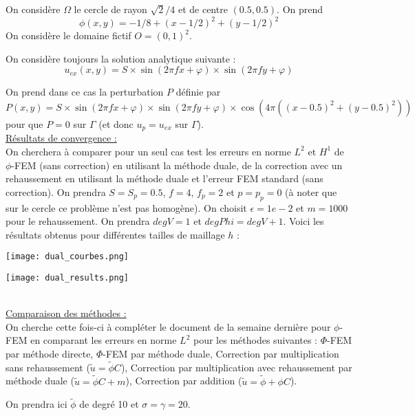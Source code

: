 On considère $\Omega$ le cercle de rayon $\sqrt{2}/4$ et de centre $(0.5,0.5)$. On prend 
$$\phi(x,y)=-1/8+(x-1/2)^2+(y-1/2)^2$$
On considère le domaine fictif $O=(0,1)^2$.


On considère toujours la solution analytique suivante :
$$u_{ex}(x,y) = S\times\sin(2\pi fx + \varphi)\times\sin(2\pi fy + \varphi)$$ 

On prend dans ce cas la perturbation $P$ définie par
$$P(x,y) = S\times\sin(2\pi fx + \varphi)\times\sin(2\pi fy + \varphi)\times\cos(4\pi((x-0.5)^2+(y-0.5)^2))$$ 
pour que $P=0$ sur $\Gamma$ (et donc $u_p=u_{ex}$ sur $\Gamma$). \\

\underline{Résultats de convergence :} \\

On cherchera à comparer pour un seul cas test les erreurs en norme $L^2$ et $H^1$ de $\phi$-FEM (sans correction) en utilisant la méthode duale, de la correction avec un rehaussement en utilisant la méthode duale et l'erreur FEM standard (sans correction). On prendra $S=S_p=0.5$, $f=4$, $f_p=2$ et $p=p_p=0$ (à noter que sur le cercle ce problème n'est pas homogène). On choisit $\epsilon=1e-2$ et $m=1000$ pour le rehaussement. On prendra $degV=1$ et $degPhi=degV+1$. Voici les résultats obtenus pour différentes tailles de maillage $h$ :

\begin{minipage}{0.38\linewidth}
	\centering
	\texttt{[image: dual\_courbes.png]}
\end{minipage}
\begin{minipage}{0.58\linewidth}
	\centering
	\texttt{[image: dual\_results.png]}
\end{minipage} \\

\underline{Comparaison des méthodes :} \\

On cherche cette fois-ci à compléter le document de la semaine dernière pour $\phi$-FEM en comparant les erreurs en norme $L^2$ pour les méthodes suivantes : $\Phi$-FEM par méthode directe, $\Phi$-FEM par méthode duale, Correction par multiplication sans rehaussement ($\tilde{u} = \tilde{\phi}C$), Correction par multiplication avec rehaussement par méthode duale ($\tilde{u} = \tilde{\phi}C+m$), Correction par addition ($\tilde{u}=\tilde{\phi}+\phi C$).  

\begin{Rem}
	On prendra ici $\tilde{\phi}$ de degré 10 et $\sigma=\gamma=20$.
\end{Rem}

